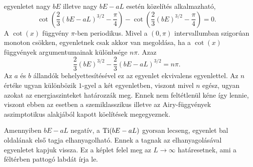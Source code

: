  egyenletet nagy $bE$ illetve nagy $bE-aL$ esetén  közelítés alkalmazható,
\begin{equation}
	\cot\left(\frac{2}{3}\left(bE-aL\right)^{3/2}-\frac{\pi}{4}\right)-\cot\left(\frac{2}{3}\left(bE\right)^{3/2}-\frac{\pi}{4}\right)=0.
	\label{quantumApprox:cot}
\end{equation}
A $\cot(x)$ függvény $\pi$-ben periodikus. Mivel a $(0,\pi)$ intervallumban szigorúan monoton csökken,  egyenletnek csak akkor van megoldása, ha a $\cot(x)$ függvények argumentumainak különbsége $n\pi$. Azaz
\begin{equation}
	\frac{2}{3}\left(bE\right)^{3/2}-\frac{2}{3}\left(bE-aL\right)^{3/2}=n\pi.
\end{equation}
Az $a$ és $b$ állandók behelyettesítésével ez az egyenlet ekvivalens  egyenlettel. Az $n$  értéke ugyan különbözik $1$-gyel a két egyenletben, viszont mivel $n$ egész, ugyan azokat az energiaszinteket határozzák meg. Ennek nem feltétlenül kéne így lennie, viszont ebben az esetben a szemiklasszikus illetve az Airy-függvények aszimptotikus alakjából kapott köelítések megegyeznek.

Amennyiben $bE-aL$ negatív, a $\mathrm{Ti}(bE-aL)$ gyorsan lecseng,  egyenlet bal oldalának első tagja elhanyagolható. Ennek a tagnak az elhanyagolásával  egyenletet kapjuk vissza. Ez a képlet felel meg az $L\to\infty$ határesetnek, ami a féltérben pattogó labdát írja le.

